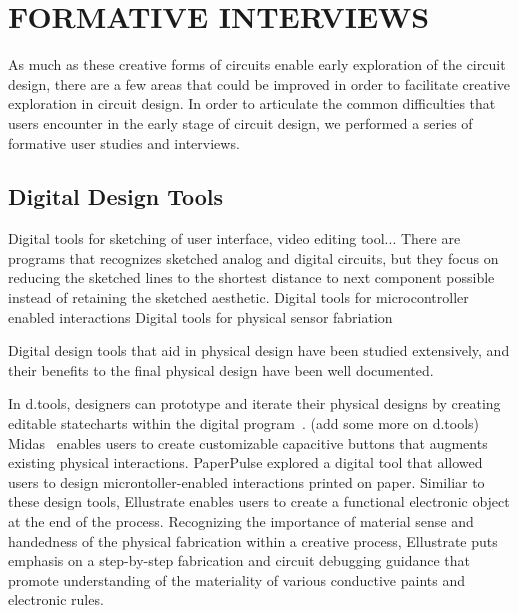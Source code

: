 \documentclass{sigchi}
\begin{document}


\section{FORMATIVE INTERVIEWS}


As much as these creative forms of circuits enable early exploration of the circuit design, there are a few areas that could be improved in order to facilitate creative exploration in circuit design. In order to articulate the common difficulties that users encounter in the early stage of circuit design, we performed a series of formative user studies and interviews. 


\subsection{Digital Design Tools}
Digital tools for sketching of user interface, video editing tool...
There are programs that recognizes sketched analog and digital circuits, but they focus on reducing the sketched lines to the shortest distance to next component possible instead of retaining the sketched aesthetic. 
Digital tools for microcontroller enabled interactions
Digital tools for physical sensor fabriation 

Digital design tools that aid in physical design have been studied extensively, and their benefits to the final physical design have been well documented. 


In d.tools,  designers can prototype and iterate their physical designs by creating editable statecharts within the digital program~\cite{hartmann_reflective_2006}. (add some more on d.tools) Midas~\cite{savage_midas:_2012} enables users to create customizable capacitive buttons that augments existing physical interactions. PaperPulse explored a digital tool that allowed users to design microntoller-enabled interactions printed on paper. Similiar to these design tools, Ellustrate enables users to create a functional electronic object at the end of the process. Recognizing the importance of material sense and handedness of the physical fabrication within a creative process, Ellustrate puts emphasis on a step-by-step fabrication and circuit debugging guidance that promote understanding of the materiality of various conductive paints and electronic rules. 
\end{document}
